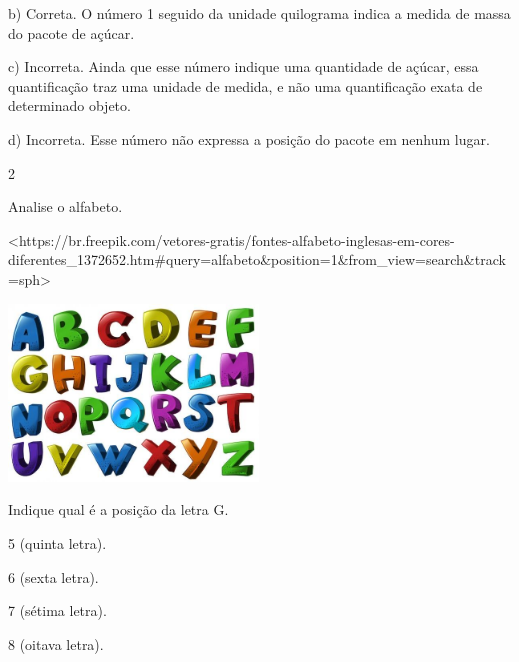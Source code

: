 {{{b) Correta. O número 1 seguido da unidade quilograma indica a medida de
massa do pacote de açúcar.

c) Incorreta. Ainda que esse número indique uma quantidade de açúcar,
essa quantificação traz uma unidade de medida, e não uma
quantificação exata de determinado objeto.

d) Incorreta. Esse número não expressa a posição do pacote em nenhum
lugar.

\num{2}

Analise o alfabeto.

\textless{}https://br.freepik.com/vetores-gratis/fontes-alfabeto-inglesas-em-cores-diferentes\_1372652.htm\#query=alfabeto\&position=1\&from\_view=search\&track=sph\textgreater{}

\includegraphics[width=2.61848in,height=1.85732in]{media/image106.jpg}

Indique qual é a posição da letra G.

\begin{escolha}
\item 5 (quinta letra).

\item 6 (sexta letra).

\item 7 (sétima letra).

\item 8 (oitava letra).
\end{escolha}

}}}
